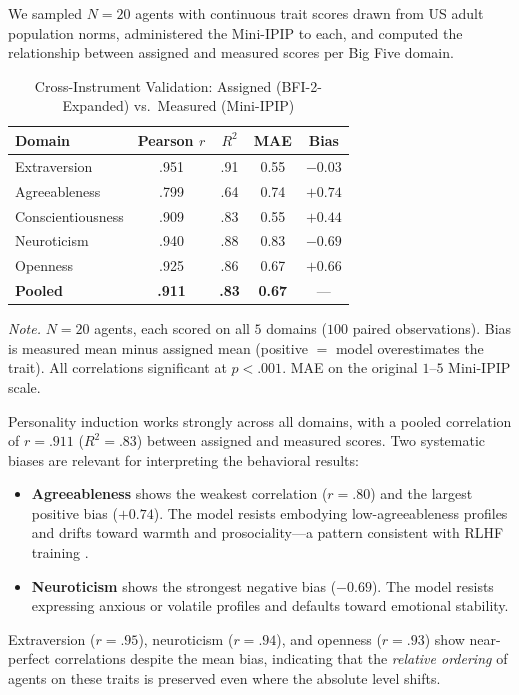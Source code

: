 \documentclass[12pt, a4paper]{article}
\begin{document}
We sampled $N = 20$ agents with continuous trait scores drawn from US adult population norms, administered the Mini-IPIP to each, and computed the relationship between assigned and measured scores per Big Five domain.

\begin{table}[H]
\centering
\caption{Cross-Instrument Validation: Assigned (BFI-2-Expanded) vs.\ Measured (Mini-IPIP)}
\label{tab:validation}
\begin{tabular}{lcccc}
\toprule
Domain & Pearson $r$ & $R^2$ & MAE & Bias \\
\midrule
Extraversion      & .951 & .91 & 0.55 & $-0.03$ \\
Agreeableness     & .799 & .64 & 0.74 & $+0.74$ \\
Conscientiousness & .909 & .83 & 0.55 & $+0.44$ \\
Neuroticism       & .940 & .88 & 0.83 & $-0.69$ \\
Openness          & .925 & .86 & 0.67 & $+0.66$ \\
\midrule
\textbf{Pooled}   & \textbf{.911} & \textbf{.83} & \textbf{0.67} & --- \\
\bottomrule
\end{tabular}

\medskip
\footnotesize
\textit{Note.} $N = 20$ agents, each scored on all $5$ domains ($100$ paired observations). Bias is measured mean minus assigned mean (positive $=$ model overestimates the trait). All correlations significant at $p < .001$. MAE on the original $1$--$5$ Mini-IPIP scale.
\end{table}

Personality induction works strongly across all domains, with a pooled correlation of $r = .911$ ($R^2 = .83$) between assigned and measured scores. Two systematic biases are relevant for interpreting the behavioral results:
\begin{itemize}
  \item \textbf{Agreeableness} shows the weakest correlation ($r = .80$) and the largest positive bias ($+0.74$). The model resists embodying low-agreeableness profiles and drifts toward warmth and prosociality---a pattern consistent with RLHF training \citep{salecha2024social}.
  \item \textbf{Neuroticism} shows the strongest negative bias ($-0.69$). The model resists expressing anxious or volatile profiles and defaults toward emotional stability.
\end{itemize}
Extraversion ($r = .95$), neuroticism ($r = .94$), and openness ($r = .93$) show near-perfect correlations despite the mean bias, indicating that the \emph{relative ordering} of agents on these traits is preserved even where the absolute level shifts.
\end{document}
